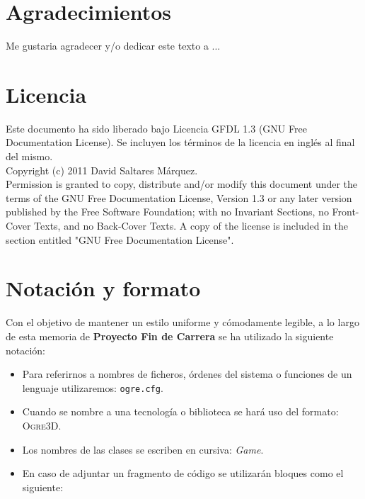 

\section*{Agradecimientos}

Me gustaria agradecer y/o dedicar este texto a ...

\cleardoublepage

\section*{Licencia} %

Este documento ha sido liberado bajo Licencia GFDL 1.3 (GNU Free
Documentation License). Se incluyen los términos de la licencia en
inglés al final del mismo.\\

Copyright (c) 2011 David Saltares Márquez.\\

Permission is granted to copy, distribute and/or modify this document under the
terms of the GNU Free Documentation License, Version 1.3 or any later version
published by the Free Software Foundation; with no Invariant Sections, no
Front-Cover Texts, and no Back-Cover Texts. A copy of the license is included in
the section entitled "GNU Free Documentation License".\\

\cleardoublepage

\section*{Notación y formato}

Con el objetivo de mantener un estilo uniforme y cómodamente legible, a lo
largo de esta memoria de \textbf{Proyecto Fin de Carrera} se ha utilizado la
siguiente notación:

\begin{itemize}
    \item Para referirnos a nombres de ficheros, órdenes del sistema o
    funciones de un lenguaje utilizaremos: \texttt{ogre.cfg}.
    \item Cuando se nombre a una tecnología o biblioteca se hará uso del
    formato: \textsc{Ogre3D}.
    \item Los nombres de las clases se escriben en cursiva: \textit{Game}.
    \item En caso de adjuntar un fragmento de código se utilizarán bloques
    como el siguiente:
    
\end{itemize}
